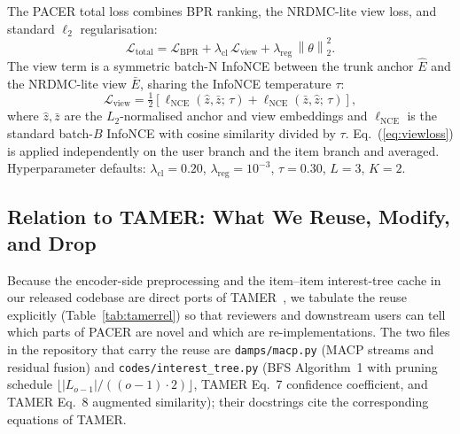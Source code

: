 \documentclass[conference]{IEEEtran}
\newcommand{\Lcal}{\mathcal{L}}
\newcommand{\norm}[1]{\left\lVert #1 \right\rVert}
\begin{document}
The PACER total loss combines BPR ranking, the NRDMC-lite view loss,
and standard $\ell_2$ regularisation:
\begin{equation}
\Lcal_{\text{total}} =
  \Lcal_{\text{BPR}}
  + \lambda_{\text{cl}}\,\Lcal_{\text{view}}
  + \lambda_{\text{reg}}\,\norm{\theta}_2^2.
\label{eq:totalloss}
\end{equation}
The view term is a symmetric batch-N InfoNCE between the trunk anchor
$\hat E$ and the NRDMC-lite view $\bar E$, sharing the InfoNCE
temperature $\tau$:
\begin{equation}
\Lcal_{\text{view}} =
  \tfrac{1}{2}\!\left[
    \ell_{\text{NCE}}(\hat z, \bar z;\, \tau)
    + \ell_{\text{NCE}}(\bar z, \hat z;\, \tau)
  \right],
\label{eq:viewloss}
\end{equation}
where $\hat z, \bar z$ are the $L_2$-normalised anchor and view
embeddings and $\ell_{\text{NCE}}$ is the standard batch-$B$ InfoNCE
with cosine similarity divided by $\tau$. Eq.~(\ref{eq:viewloss}) is
applied independently on the user branch and the item branch and
averaged. Hyperparameter defaults: $\lambda_{\text{cl}}{=}0.20$,
$\lambda_{\text{reg}}{=}10^{-3}$, $\tau{=}0.30$, $L{=}3$, $K{=}2$.

\subsection{Relation to TAMER: What We Reuse, Modify, and Drop}
\label{sec:tamerrel}

Because the encoder-side preprocessing and the item--item interest-tree
cache in our released codebase are direct ports of
TAMER~\cite{meng2025tamer}, we tabulate the reuse explicitly
(Table~\ref{tab:tamerrel}) so that reviewers and downstream users can
tell which parts of PACER are novel and which are re-implementations.
The two files in the repository that carry the reuse are
\texttt{damps/macp.py} (MACP streams and residual fusion) and
\texttt{codes/interest\_tree.py} (BFS Algorithm~1 with pruning
schedule $\lfloor\lvert L_{o-1}\rvert/((o-1)\cdot 2)\rfloor$, TAMER
Eq.~7 confidence coefficient, and TAMER Eq.~8 augmented similarity);
their docstrings cite the corresponding equations of TAMER.
\end{document}
